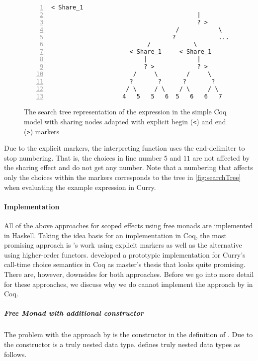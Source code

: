 \begin{figure}[h]
 \centering
\begin{Verbatim}[numbers=left, xleftmargin=5mm]
                                     < Share_1
                                         |
                                         ? >
                                   /           \
                                  ?            ...
                           /            \
                      < Share_1     < Share_1
                          |              |
                          ? >            ? >
                       /     \        /     \
                      ?       ?      ?       ?
                     / \     / \    / \     / \
                    4   5   5   6  5   6   6   7
\end{Verbatim}
\caption{The search tree representation of the expression  in the simple Coq model with sharing nodes adapted with explicit begin (\texttt{<}) and end (\texttt{>}) markers}
\label{fig:searchTreeScope}
\end{figure}

Due to the explicit markers, the interpreting function \cinl{numberChoices} uses the end-delimiter to stop numbering.
That is, the choices in line number $5$ and $11$ are not affected by the sharing effect and do not get any number.
Note that a numbering that affects only the choices within the markers corresponds to the tree in \autoref{fig:searchTree} when evaluating the example expression in Curry.

\paragraph{Implementation}
\label{para:implementationcalltime}

All of the above approaches for scoped effects using free monads are implemented in Haskell.
Taking the idea basis for an implementation in Coq, the most promising approach is \citeauthor{wu2014effect}'s work using explicit markers as well as the alternative using higher-order functors. \citet{bunkenburg2019modeling} developed a prototypic implementation for Curry's call-time choice semantics in Coq as master's thesis that looks quite promising.
There are, however, downsides for both approaches.
Before we go into more detail for these approaches, we discuss why we do cannot implement the approach by \citeauthor{pirog2018syntax} in Coq.

\subparagraph{Free Monad with additional constructor}
The problem with the approach by \citeauthor{pirog2018syntax} is the  constructor in the definition of .
Due to the \hinl{Scope} constructor \hinl{Prog} is a truly nested data type.
\citet{matthes2008recursion} defines truly nested data types as follows.


